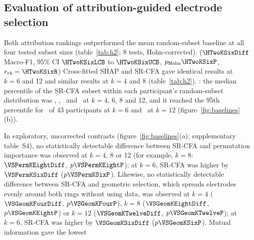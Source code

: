 \subsection[Evaluation of attribution-guided electrode selection]{Evaluation of attribution-guided electrode selection}
\label{sec:res_attribution}

Both attribution rankings outperformed the mean random-subset baseline at all four tested subset sizes (table~\ref{tab:h2}; 8 tests, Holm-corrected).  ($\HTwoKSixDiff$ Macro-F1, 95\% CI $\HTwoKSixLCB$ to $\HTwoKSixUCB$, $p_{\mathrm{Holm}} \HTwoKSixP$, $r_{rb} = \HTwoKSixR$)  Cross-fitted SHAP and SR-CFA gave identical results at $k = 6$ and 12 and similar results at $k = 4$ and 8 (table~\ref{tab:h2}). : the median percentile of the SR-CFA subset within each participant's random-subset distribution was \PctKFour, \PctKSix, \PctKEight\ and \PctKTwelve\ at $k = 4$, 6, 8 and 12, and it reached the 95th percentile for \PctKAboveNinetyFiveSix\ of 43 participants at $k = 6$ and \PctKAboveNinetyFiveTwelve\ at $k = 12$ (figure~\ref{fig:baselines}(b)).



In exploratory, uncorrected contrasts (figure~\ref{fig:baselines}(a); supplementary table~S4), no statistically detectable difference between SR-CFA and permutation importance was observed at $k = 4$, 8 or 12 (for example, $k = 8$: $\VSPermKEightDiff$, $p \VSPermKEightP$); at $k = 6$, SR-CFA was higher by $\VSPermKSixDiff$ ($p \VSPermKSixP$). Likewise, no statistically detectable difference between SR-CFA and geometric selection, which spreads electrodes evenly around both rings without using data, was observed at $k = 4$ ($\VSGeomKFourDiff$, $p \VSGeomKFourP$), $k = 8$ ($\VSGeomKEightDiff$, $p \VSGeomKEightP$) or $k = 12$ ($\VSGeomKTwelveDiff$, $p \VSGeomKTwelveP$); at $k = 6$, SR-CFA was higher by $\VSGeomKSixDiff$ ($p \VSGeomKSixP$). Mutual information gave the lowest 

